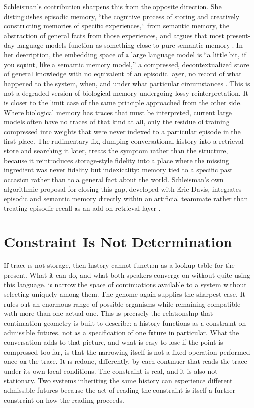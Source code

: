\documentclass[11pt]{article}
\begin{document}
Schleisman's contribution sharpens this from the opposite direction. She distinguishes episodic memory, ``the cognitive process of storing and creatively constructing memories of specific experiences,'' from semantic memory, the abstraction of general facts from those experiences, and argues that most present-day language models function as something close to pure semantic memory \cite{levinschleisman2026}. In her description, the embedding space of a large language model is ``a little bit, if you squint, like a semantic memory model,'' a compressed, decontextualized store of general knowledge with no equivalent of an episodic layer, no record of what happened to the system, when, and under what particular circumstances \cite{levinschleisman2026}. This is not a degraded version of biological memory undergoing lossy reinterpretation. It is closer to the limit case of the same principle approached from the other side. Where biological memory has traces that must be interpreted, current large models often have no traces of that kind at all, only the residue of training compressed into weights that were never indexed to a particular episode in the first place. The rudimentary fix, dumping conversational history into a retrieval store and searching it later, treats the symptom rather than the structure, because it reintroduces storage-style fidelity into a place where the missing ingredient was never fidelity but indexicality: memory tied to a specific past occasion rather than to a general fact about the world. Schleisman's own algorithmic proposal for closing this gap, developed with Eric Davis, integrates episodic and semantic memory directly within an artificial teammate rather than treating episodic recall as an add-on retrieval layer \cite{davisschleisman}.

\section{Constraint Is Not Determination}

If trace is not storage, then history cannot function as a lookup table for the present. What it can do, and what both speakers converge on without quite using this language, is narrow the space of continuations available to a system without selecting uniquely among them. The genome again supplies the sharpest case. It rules out an enormous range of possible organisms while remaining compatible with more than one actual one. This is precisely the relationship that continuation geometry is built to describe: a history functions as a constraint on admissible futures, not as a specification of one future in particular. What the conversation adds to that picture, and what is easy to lose if the point is compressed too far, is that the narrowing itself is not a fixed operation performed once on the trace. It is redone, differently, by each continuer that reads the trace under its own local conditions. The constraint is real, and it is also not stationary. Two systems inheriting the same history can experience different admissible futures because the act of reading the constraint is itself a further constraint on how the reading proceeds.
\end{document}

